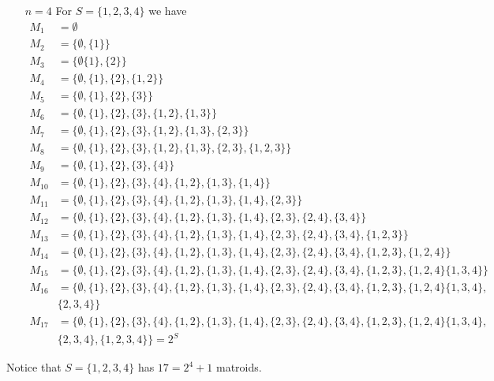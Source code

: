 \begin{example}
        \begin{enumerate}
            \item [\underline{$n=4$}] For $S=\{1,2,3,4\}$ we have
                \begin{align*}
                    M_1 &= \emptyset \\
                    M_2 &= \{\emptyset, \{1\}\} \\
                    M_3 &= \{\emptyset \{1\},\{2\}\} \\
                    M_4 &= \{\emptyset,\{1\},\{2\},\{1,2\}\} \\
                    M_5 &= \{\emptyset, \{1\}, \{2\}, \{3\}\} \\
                    M_6 &= \{\emptyset, \{1\}, \{2\}, \{3\}, \{1,2\}, \{1,3\}\} \\
                    M_7 &= \{\emptyset, \{1\}, \{2\}, \{3\}, \{1,2\}, \{1,3\}, \{2,3\}\} \\
                    M_8 &= \{\emptyset, \{1\}, \{2\}, \{3\}, \{1,2\}, \{1,3\}, \{2,3\},
                    \{1,2,3\}\} \\
                    M_9 &= \{\emptyset, \{1\}, \{2\}, \{3\}, \{4\}\} \\
                    M_{10} &= \{\emptyset, \{1\}, \{2\}, \{3\}, \{4\}, \{1,2\}, \{1,3\}, \{1,4\}\}
                    \\
                    M_{11} &= \{\emptyset, \{1\}, \{2\}, \{3\}, \{4\}, \{1,2\}, \{1,3\}, \{1,4\},
                    \{2,3\}\} \\
                    M_{12} &= \{\emptyset, \{1\}, \{2\}, \{3\}, \{4\}, \{1,2\}, \{1,3\}, \{1,4\},
                    \{2,3\}, \{2,4\}, \{3,4\}\} \\
                    M_{13} &= \{\emptyset, \{1\}, \{2\}, \{3\}, \{4\}, \{1,2\}, \{1,3\}, \{1,4\},
                    \{2,3\}, \{2,4\}, \{3,4\}, \{1,2,3\}\} \\
                    M_{14} &= \{\emptyset, \{1\}, \{2\}, \{3\}, \{4\}, \{1,2\}, \{1,3\}, \{1,4\},
                    \{2,3\}, \{2,4\}, \{3,4\}, \{1,2,3\}, \{1,2,4\}\} \\
                    M_{15} &= \{\emptyset, \{1\}, \{2\}, \{3\}, \{4\}, \{1,2\}, \{1,3\}, \{1,4\},
                    \{2,3\}, \{2,4\}, \{3,4\}, \{1,2,3\}, \{1,2,4\} \{1,3,4\}\} \\
                    M_{16} &= \{\emptyset, \{1\}, \{2\}, \{3\}, \{4\}, \{1,2\}, \{1,3\}, \{1,4\},
                    \{2,3\}, \{2,4\}, \{3,4\}, \{1,2,3\}, \{1,2,4\} \{1,3,4\}, \\ & \{2,3,4\}\} \\
                    M_{17} &= \{\emptyset, \{1\}, \{2\}, \{3\}, \{4\}, \{1,2\}, \{1,3\}, \{1,4\},
                    \{2,3\}, \{2,4\}, \{3,4\}, \{1,2,3\}, \{1,2,4\} \{1,3,4\}, \\ & \{2,3,4\},
                        \{1,2,3,4\}\}=2^S 
                \end{align*}
        \end{enumerate}
        Notice that $S=\{1,2,3,4\}$ has $17=2^4+1$ matroids.
\end{example} 

